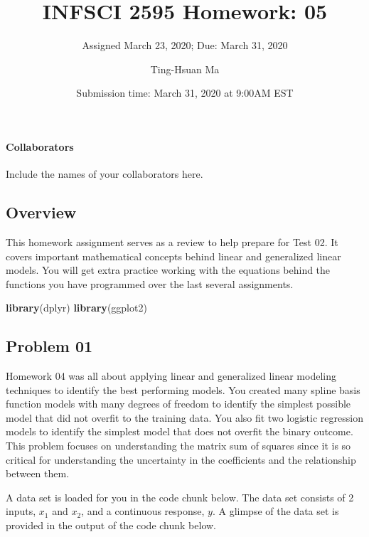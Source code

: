 \documentclass[
]{article}
\title{INFSCI 2595 Homework: 05}
\subtitle{Assigned March 23, 2020; Due: March 31, 2020}
\author{Ting-Hsuan Ma}
\date{Submission time: March 31, 2020 at 9:00AM EST}
\newenvironment{Shaded}{\begin{snugshade}}{\end{snugshade}}
\newcommand{\KeywordTok}[1]{\textcolor[rgb]{0.13,0.29,0.53}{\textbf{#1}}}
\newcommand{\NormalTok}[1]{#1}
\begin{document}
\maketitle

\hypertarget{collaborators}{%
\paragraph{Collaborators}\label{collaborators}}

Include the names of your collaborators here.

\hypertarget{overview}{%
\subsection{Overview}\label{overview}}

This homework assignment serves as a review to help prepare for Test 02.
It covers important mathematical concepts behind linear and generalized
linear models. You will get extra practice working with the equations
behind the functions you have programmed over the last several
assignments.

\begin{Shaded}
\begin{Highlighting}[]
\KeywordTok{library}\NormalTok{(dplyr)}
\KeywordTok{library}\NormalTok{(ggplot2)}
\end{Highlighting}
\end{Shaded}

\hypertarget{problem-01}{%
\subsection{Problem 01}\label{problem-01}}

Homework 04 was all about applying linear and generalized linear
modeling techniques to identify the best performing models. You created
many spline basis function models with many degrees of freedom to
identify the simplest possible model that did not overfit to the
training data. You also fit two logistic regression models to identify
the simplest model that does not overfit the binary outcome. This
problem focuses on understanding the matrix sum of squares since it is
so critical for understanding the uncertainty in the coefficients and
the relationship between them.

A data set is loaded for you in the code chunk below. The data set
consists of 2 inputs, \(x_1\) and \(x_2\), and a continuous response,
\(y\). A glimpse of the data set is provided in the output of the code
chunk below.
\end{document}
